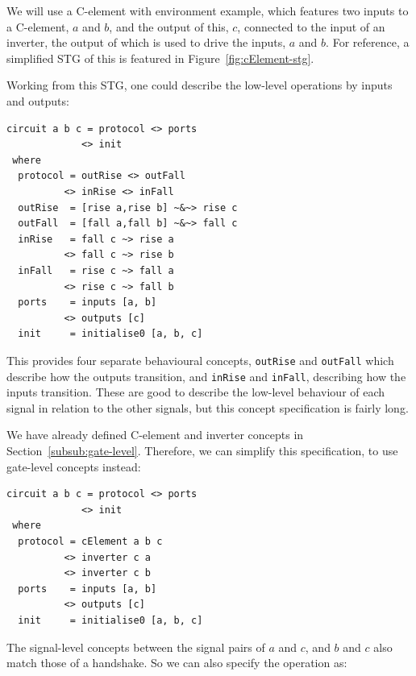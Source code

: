 \documentclass[british, 10pt, conference, compsocconf]{IEEEtran}
\begin{document}
We will use a C-element with environment example, which features two inputs to a C-element, $a$ and $b$, and the output
of this, $c$, connected to the input of an inverter, the output of which is used to drive the inputs, $a$ and $b$.
For reference, a simplified STG of this is featured in Figure~\ref{fig:cElement-stg}.


Working from this STG, one could describe the low-level operations by inputs and outputs:

\begin{verbatim}
circuit a b c = protocol <> ports 
             <> init
 where
  protocol = outRise <> outFall 
          <> inRise <> inFall
  outRise  = [rise a,rise b] ~&~> rise c
  outFall  = [fall a,fall b] ~&~> fall c
  inRise   = fall c ~> rise a 
          <> fall c ~> rise b
  inFall   = rise c ~> fall a 
          <> rise c ~> fall b
  ports    = inputs [a, b] 
          <> outputs [c]
  init     = initialise0 [a, b, c]
\end{verbatim}


\noindent This provides four separate behavioural concepts, \texttt{outRise} and \texttt{outFall}
which describe how the outputs transition, and
\texttt{inRise} and \texttt{inFall}, describing how the inputs transition. These are good
to describe the low-level behaviour of each signal in relation to the other signals, but this concept specification
is fairly long. 

We have already defined C-element and inverter concepts
in Section~\ref{subsub:gate-level}. Therefore, we can simplify this specification, 
to use gate-level concepts instead:


\begin{verbatim}
circuit a b c = protocol <> ports 
             <> init
 where
  protocol = cElement a b c 
          <> inverter c a 
          <> inverter c b
  ports    = inputs [a, b] 
          <> outputs [c]
  init     = initialise0 [a, b, c]
\end{verbatim}

The signal-level concepts between the signal pairs of $a$ and $c$, and $b$ and $c$
also match those of a handshake. So we can also specify the operation as:
\end{document}

